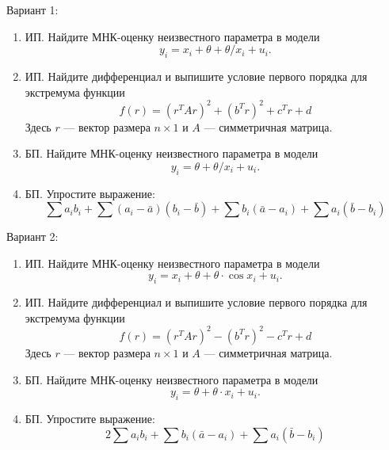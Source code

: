 \documentclass[12pt]{article}
\begin{document}
 


Вариант 1:

\begin{enumerate}

  \item ИП. Найдите МНК-оценку неизвестного параметра в модели 
  \[
      y_i = x_i + \theta + \theta / x_i + u_i.
\]

  \item ИП. Найдите дифференциал и выпишите условие первого порядка для экстремума функции 
  \[
  f(r) = (r^T A r)^2 + (b^T r)^2 + c^T r + d
  \]
  Здесь $r$ — вектор размера $n\times 1$ и $A$ — симметричная матрица. 

  \item БП. Найдите МНК-оценку неизвестного параметра в модели 
  \[
      y_i = \theta + \theta / x_i + u_i.
\]


  \item БП. Упростите выражение:
\[
    \sum a_i b_i  + \sum (a_i - \bar a)(b_i - \bar b) +  \sum b_i (\bar a - a_i) + \sum a_i (\bar b - b_i) 
\]

\end{enumerate}


Вариант 2:

\begin{enumerate}

    \item ИП. Найдите МНК-оценку неизвестного параметра в модели 
    \[
        y_i = x_i + \theta + \theta \cdot \cos x_i + u_i.
  \]
  
    \item ИП. Найдите дифференциал и выпишите условие первого порядка для экстремума функции 
    \[
    f(r) = (r^T A r)^2 - (b^T r)^2 - c^T r + d
    \]
    Здесь $r$ — вектор размера $n\times 1$ и $A$ — симметричная матрица. 
  
    \item БП. Найдите МНК-оценку неизвестного параметра в модели 
    \[
        y_i = \theta + \theta \cdot x_i + u_i.
  \]
  
  
    \item БП. Упростите выражение:
  \[
      2\sum a_i b_i  +  \sum b_i (\bar a - a_i) + \sum a_i (\bar b - b_i) 
  \]
  
  \end{enumerate}
  
  
\end{document}
